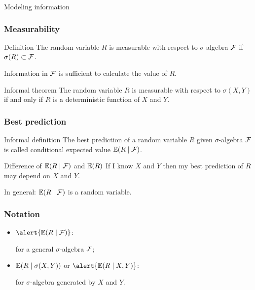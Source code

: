 \begin{frame}{Modeling information}
    


    
\end{frame}



\begin{frame}
    \frametitle{Measurability}

    \pause
    \begin{block}{Definition \formalduck}
        The random variable $R$ is measurable with respect to $\sigma$-algebra $\mathcal{F}$ if 
        $\sigma(R) \subset \mathcal{F}$. 
    \end{block}
    \pause
    Information in $\mathcal{F}$ is sufficient to calculate the value of $R$.
    \pause
    \begin{block}{Informal theorem \informalduck}
        The random variable $R$ is measurable with respect to $\sigma(X, Y)$ if and only if
        $R$ is a deterministic function of $X$ and $Y$.  
    \end{block}
\end{frame}


\begin{frame}
    \frametitle{Best prediction}

    \begin{block}{Informal definition \informalduck}
        The \alert{best prediction} of a random variable $R$ given $\sigma$-algebra $\mathcal{F}$ is called 
        \alert{conditional expected value} $\mathbb{E}(R \mid \mathcal{F})$.
    \end{block}

    \pause 
    \begin{block}{Difference of $\mathbb{E}(R \mid \mathcal{F})$ and $\mathbb{E}(R)$}
    If I know $X$ and $Y$ then my best prediction of $R$ may depend on $X$ and $Y$.

    In general: $\mathbb{E}(R \mid \mathcal{F})$ is a \alert{random variable}.
    \end{block}
\end{frame}


\begin{frame}
    \frametitle{Notation}

    \begin{itemize}[<+->]
        \item $\alert{\E(R \mid \cF)}$: 
        
        for a general $\sigma$-algebra $\mathcal{F}$;
        \item $\mathbb{E}(R \mid \sigma(X, Y))$ or $\alert{\E(R \mid X, Y)}$: 
        
        for $\sigma$-algebra generated by $X$ and $Y$.
    \end{itemize}
\end{frame}

